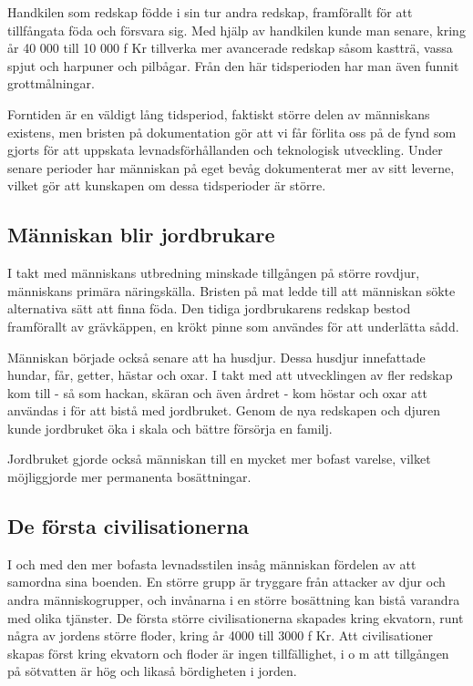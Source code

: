 \documentclass[a4paper,12pt,fleqn]{article}
\begin{document}
Handkilen som redskap födde i sin tur andra redskap, framförallt för att tillfångata föda och försvara sig. Med hjälp av handkilen kunde man senare, kring år 40 000 till 10 000 f Kr tillverka mer avancerade redskap såsom kastträ, vassa spjut och harpuner och pilbågar. Från den här tidsperioden har man även funnit grottmålningar.

Forntiden är en väldigt lång tidsperiod, faktiskt större delen av människans existens, men bristen på dokumentation gör att vi får förlita oss på de fynd som gjorts för att uppskata levnadsförhållanden och teknologisk utveckling. Under senare perioder har människan på eget bevåg dokumenterat mer av sitt leverne, vilket gör att kunskapen om dessa tidsperioder är större. 

\subsection{Människan blir jordbrukare}
I takt med människans utbredning minskade tillgången på större rovdjur, människans primära näringskälla. Bristen på mat ledde till att människan sökte alternativa sätt att finna föda. Den tidiga jordbrukarens redskap bestod framförallt av grävkäppen, en krökt pinne som användes för att underlätta sådd. 

Människan började också senare att ha husdjur. Dessa husdjur innefattade hundar, får, getter, hästar och oxar. I takt med att utvecklingen av fler redskap kom till - så som hackan, skäran och även årdret -  kom höstar och oxar att användas i för att bistå med jordbruket. Genom de nya redskapen och djuren kunde jordbruket öka i skala och bättre försörja en familj. 

Jordbruket gjorde också människan till en mycket mer bofast varelse, vilket möjliggjorde mer permanenta bosättningar. 

\subsection{De första civilisationerna}

I och med den mer bofasta levnadsstilen insåg människan fördelen av att samordna sina boenden. En större grupp är tryggare från attacker av djur och andra människogrupper, och invånarna i en större bosättning kan bistå varandra med olika tjänster. De första större civilisationerna skapades kring ekvatorn, runt några av jordens större floder, kring år 4000 till 3000 f Kr. Att civilisationer skapas först kring ekvatorn och floder är ingen tillfällighet, i o m att tillgången på sötvatten är hög och likaså bördigheten i jorden. 
\end{document}
